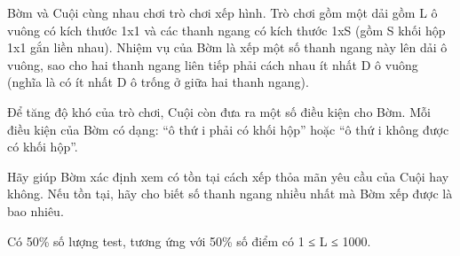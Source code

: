 Bờm và Cuội cùng nhau chơi trò chơi xếp hình. Trò chơi gồm một dải gồm L ô vuông có kích thước 1x1 và các thanh ngang có kích thước 1xS (gồm S khối hộp 1x1 gắn liền nhau). Nhiệm vụ của Bờm là xếp một số thanh ngang này lên dải ô vuông, sao cho hai thanh ngang liên tiếp phải cách nhau ít nhất D ô vuông (nghĩa là có ít nhất D ô trống ở giữa hai thanh ngang).

Để tăng độ khó của trò chơi, Cuội còn đưa ra một số điều kiện cho Bờm. Mỗi điều kiện của Bờm có dạng: “ô thứ i phải có khối hộp” hoặc “ô thứ i không được có khối hộp”.

Hãy giúp Bờm xác định xem có tồn tại cách xếp thỏa mãn yêu cầu của Cuội hay không. Nếu tồn tại, hãy cho biết số thanh ngang nhiều nhất mà Bờm xếp được là bao nhiêu.

Có 50\% số lượng test, tương ứng với 50\% số điểm có 1 ≤ L ≤ 1000.